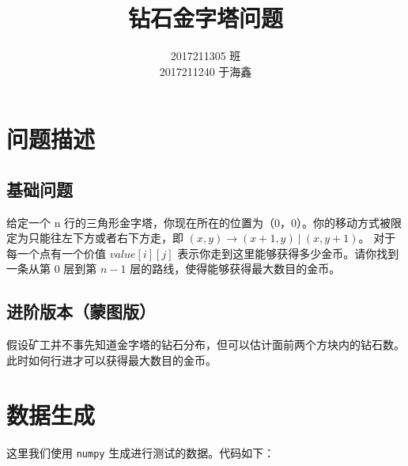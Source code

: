 \documentclass[11pt]{article}
\title{钻石金字塔问题}
\author{2017211305 班 \\ 2017211240 于海鑫}
\begin{document}
    
    
    \maketitle
    
    

    
    \section{问题描述}\label{ux95eeux9898ux63cfux8ff0}

\subsection{基础问题}\label{ux57faux7840ux95eeux9898}

给定一个 n
⾏的三角形⾦字塔，你现在所在的位置为（0，0）。你的移动⽅式被限定为只能往左下方或者右下方走，即
\((x, y) \to (x + 1, y)\ |\ (x, y + 1)\)。 对于每一个点有一个价值
\(value[i][j]\) 表示你⾛到这里能够获得多少⾦币。请你找到⼀条从第 \(0\)
层到第 \(n-1\) 层的路线，使得能够获得最⼤数目的金币。
\subsection{进阶版本（蒙图版）}
假设矿工并不事先知道金字塔的钻石分布，但可以估计面前两个方块内的钻石数。此时如何行进才可以获得最大数目的金币。
\section{数据生成}
这里我们使用 \texttt{numpy} 生成进行测试的数据。代码如下：
\end{document}
